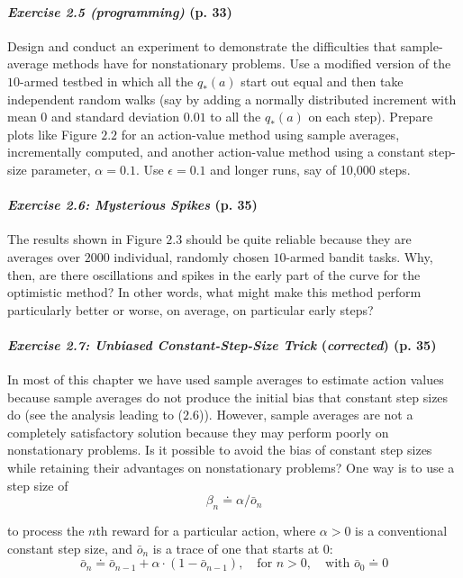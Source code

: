 \documentclass[10pt,a4paper]{article}
\begin{document}
\paragraph{\textit{Exercise 2.5 (programming)} (p. 33)} Design and conduct an experiment to demonstrate the
difficulties that sample-average methods have for nonstationary problems. Use a modified version of the $10$-armed testbed in which all the $q_*(a)$ start out equal and then take independent random walks (say by adding a normally distributed increment with mean $0$ and standard deviation $0.01$ to all the $q_*(a)$ on each step). Prepare plots like Figure $2.2$
for an action-value method using sample averages, incrementally computed, and another action-value method using a constant step-size parameter, $\alpha = 0.1$. Use $\epsilon = 0.1$ and
longer runs, say of 10,000 steps.

\paragraph{\textit{Exercise 2.6: Mysterious Spikes} (p. 35)} The results shown in Figure $2.3$ should be quite reliable because they are averages over $2000$ individual, randomly chosen $10$-armed bandit tasks.
Why, then, are there oscillations and spikes in the early part of the curve for the optimistic method? In other words, what might make this method perform particularly better or worse, on average, on particular early steps?

\paragraph{\textit{Exercise 2.7: Unbiased Constant-Step-Size Trick} (\textit{corrected}) (p. 35)} In most of this chapter we have used
sample averages to estimate action values because sample averages do not produce the
initial bias that constant step sizes do (see the analysis leading to ($2.6$)). However, sample averages are not a completely satisfactory solution because they may perform poorly on nonstationary problems. Is it possible to avoid the bias of constant step sizes while retaining their advantages on nonstationary problems? One way is to use a step size of
\begin{equation}
\beta_n \doteq \alpha/\bar{o}_n
\end{equation}

to process the $n$th reward for a particular action, where $\alpha > 0$ is a conventional constant step size, and $\bar{o}_n$ is a trace of one that starts at $0$:
\begin{equation}
\bar{o}_n \doteq \bar{o}_{n-1} + \alpha \cdot (1 - \bar{o}_{n-1}),\quad \textrm{for } n > 0,\quad \textrm{with } \bar{o}_0 \doteq 0
\end{equation}
\end{document}
